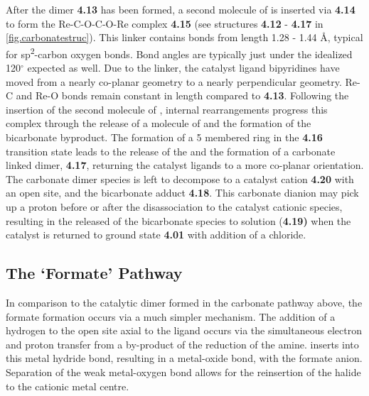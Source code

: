After the dimer \textbf{4.13} has been formed, a second molecule of  is inserted via \textbf{4.14} to form the Re-C-O-C-O-Re complex \textbf{4.15} (see structures \textbf{4.12} - \textbf{4.17} in \autoref{fig.carbonatestruc}). This linker contains bonds from length 1.28 - 1.44 \r{A}, typical for sp\textsuperscript{2}-carbon oxygen bonds. Bond angles are typically just under the idealized 120$^\circ$ expected as well. Due to the linker, the catalyst ligand bipyridines have moved from a nearly co-planar geometry to a nearly perpendicular geometry. Re-C and Re-O bonds remain constant in length compared to \textbf{4.13}. Following the insertion of the second molecule of , internal rearrangements progress this complex through the release of a molecule of  and the formation of the bicarbonate byproduct. The formation of a 5 membered ring in the \textbf{4.16} transition state leads to the release of the  and the formation of a carbonate linked dimer, \textbf{4.17}, returning the catalyst ligands to a more co-planar orientation. The carbonate dimer species is left to decompose to a catalyst cation \textbf{4.20} with an open site, and the bicarbonate adduct \textbf{4.18}. This carbonate dianion may pick up a proton before or after the disassociation to the catalyst cationic species, resulting in the released of the bicarbonate species to solution (\textbf{4.19)} when the catalyst is returned to ground state \textbf{4.01} with addition of a chloride. 

\subsection{The `Formate' Pathway}\label{ss.formate}
In comparison to the catalytic dimer formed in the carbonate pathway above, the formate formation occurs via a much simpler mechanism. The addition of a hydrogen to the open site axial to the ligand occurs via the simultaneous electron and proton transfer from a by-product of the reduction of the amine.  inserts into this metal hydride bond, resulting in a metal-oxide bond, with the formate anion\autocite{creutz2007}. Separation of the weak metal-oxygen bond allows for the reinsertion of the halide to the cationic metal centre. 

